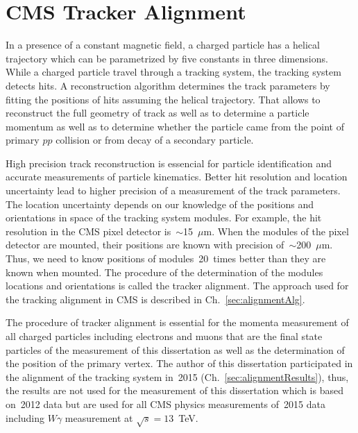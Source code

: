 \chapter{CMS Tracker Alignment} %
\label{sec:alignment}

In a presence of a constant magnetic field, a charged particle has a helical trajectory which can be parametrized by five constants in three dimensions. While a charged particle travel through a tracking system, the tracking system detects hits. A reconstruction algorithm determines the track parameters by fitting the positions of hits assuming the helical trajectory. That allows to reconstruct the full geometry of track as well as to determine a particle momentum as well as to determine whether the particle came from the point of primary $pp$ collision or from decay of a secondary particle.

High precision track reconstruction is essencial for particle identification and accurate measurements of particle kinematics. Better hit resolution and location uncertainty lead to higher precision of a measurement of the track parameters. The location uncertainty depends on our knowledge of the positions and orientations in space of the tracking system modules. For example, the hit resolution in the CMS pixel detector is~$\sim$15~$\mu$m. When the modules of the pixel detector are mounted, their positions are known with precision of~$\sim$200~$\mu$m. Thus, we need to know positions of modules~20~times better than they are known when mounted. The procedure of the determination of the modules locations and orientations is called the tracker alignment. The approach used for the tracking alignment in CMS is described in Ch.~\ref{sec:alignmentAlg}.

The procedure of tracker alignment is essential for the momenta measurement of all charged particles including electrons and muons that are the final state particles of the measurement of this dissertation as well as the determination of the position of the primary vertex. The author of this dissertation participated in the alignment of the tracking system in~2015 (Ch.~\ref{sec:alignmentResults}), thus, the results are not used for the measurement of this dissertation which is based on~2012 data but are used for all CMS physics measurements of~2015 data including $W\gamma$ measurement at $\sqrt{s}=13$~TeV. 

